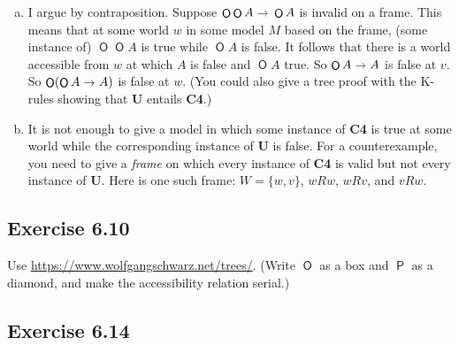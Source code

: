 \documentclass{scrartcl}
\let\oldto\to
\renewcommand\to{\scaleobj{0.95}{\,\oldto\,}}
\DeclareMathOperator{\Ob}{\mathsf{O}}
\DeclareMathOperator{\Pe}{\mathsf{P}}
\begin{document}
%
%
  \begin{enumerate}[(a)]
  \item I argue by contraposition. Suppose $\Ob\Ob A \to \Ob A$ is invalid
    on a frame. This means that at some world $w$ in some model $M$ based on the
    frame, (some instance of) $\Ob\Ob A$ is true while $\Ob A$ is false. It
    follows that there is a world accessible from $w$ at which $A$ is false and
    $\Ob A$ true. So $\Ob A \to A$ is false at $v$. So $\Ob (\Ob A \to A)$ is
    false at $w$. (You could also give a tree proof with the K-rules showing
    that \textbf{U} entails \textbf{C4}.)

    \item It is not enough to give a model in which some instance of \textbf{C4}
    is true at some world while the corresponding instance of \textbf{U} is
    false. For a counterexample, you need to give a \emph{frame} on which every
    instance of \textbf{C4} is valid but not every instance of \textbf{U}. Here
    is one such frame: $W = \{w,v\}$, $wRw$, $wRv$, and $vRw$.
  \end{enumerate}

  \subsection*{Exercise 6.10}

%
%
  Use
  \href{https://www.wolfgangschwarz.net/trees/}{https://www.wolfgangschwarz.net/trees/}.
  (Write $\Ob$ as a box and $\Pe$ as a diamond, and make the accessibility
  relation serial.)
  
  \subsection*{Exercise 6.14}
\end{document}
